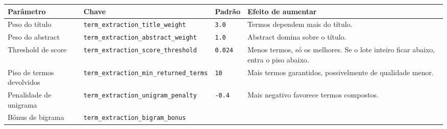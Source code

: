 \documentclass[
  brazilian,
  a4paper,12pt,oneside]{report}
\newcounter{none} %
\begin{document}
{\def\LTcaptype{none} %
\begin{longtable}[]{@{}
  >{\raggedright\arraybackslash}p{}
  >{\raggedright\arraybackslash}p{}
  >{\raggedright\arraybackslash}p{}
  >{\raggedright\arraybackslash}p{}@{}}
\toprule\noalign{}
\begin{minipage}[b]{\linewidth}\raggedright
Parâmetro
\end{minipage} & \begin{minipage}[b]{\linewidth}\raggedright
Chave
\end{minipage} & \begin{minipage}[b]{\linewidth}\raggedright
Padrão
\end{minipage} & \begin{minipage}[b]{\linewidth}\raggedright
Efeito de aumentar
\end{minipage} \\
\midrule\noalign{}
\endhead
\bottomrule\noalign{}
\endlastfoot
Peso do título &
\texttt{term\_}\allowbreak{}\texttt{extraction\_}\allowbreak{}\texttt{title\_}\allowbreak{}\texttt{weight}
& \texttt{3.}\allowbreak{}\texttt{0} & Termos dependem mais do
título. \\
Peso do abstract &
\texttt{term\_}\allowbreak{}\texttt{extraction\_}\allowbreak{}\texttt{abstract\_}\allowbreak{}\texttt{weight}
& \texttt{1.}\allowbreak{}\texttt{0} & Abstract domina sobre o
título. \\
Threshold de score &
\texttt{term\_}\allowbreak{}\texttt{extraction\_}\allowbreak{}\texttt{score\_}\allowbreak{}\texttt{threshold}
& \texttt{0.}\allowbreak{}\texttt{024} & Menos termos, só os melhores.
Se o lote inteiro ficar abaixo, entra o piso abaixo. \\
Piso de termos devolvidos &
\texttt{term\_}\allowbreak{}\texttt{extraction\_}\allowbreak{}\texttt{min\_}\allowbreak{}\texttt{returned\_}\allowbreak{}\texttt{terms}
& \texttt{10} & Mais termos garantidos, possivelmente de qualidade
menor. \\
Penalidade de unigrama &
\texttt{term\_}\allowbreak{}\texttt{extraction\_}\allowbreak{}\texttt{unigram\_}\allowbreak{}\texttt{penalty}
& \texttt{-}\allowbreak{}\texttt{0.}\allowbreak{}\texttt{4} & Mais
negativo favorece termos compostos. \\
Bônus de bigrama &
\texttt{term\_}\allowbreak{}\texttt{extraction\_}\allowbreak{}\texttt{bigram\_}\allowbreak{}\texttt{bonus}

\end{longtable}}
\end{document}
